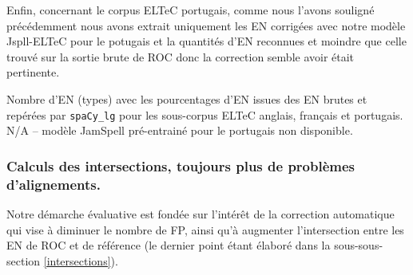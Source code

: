 Enfin, concernant le corpus ELTeC portugais, comme nous l'avons souligné précédemment nous avons extrait uniquement les EN corrigées avec notre modèle Jspll-ELTeC pour le potugais et la quantités d'EN reconnues et moindre que celle trouvé sur la sortie brute de ROC donc la correction semble avoir était pertinente.
\begin{table}[h!]
    \centering
    \small
    
    \caption{Nombre d'EN (types) avec les pourcentages d'EN issues des EN brutes et repérées par \texttt{spaCy\_lg} pour les sous-corpus ELTeC anglais, français et portugais. N/A -- modèle JamSpell pré-entrainé pour le portugais non disponible.}
    \label{tab:ELTeC}
\end{table}

\subsubsection{Calculs des intersections, toujours plus de problèmes d'alignements. }
Notre démarche évaluative est fondée sur l'intérêt de la correction automatique qui vise à diminuer le nombre de FP, ainsi qu'à augmenter l'intersection entre les EN de ROC et de référence (le dernier point étant élaboré dans la sous-sous-section \ref{intersections}). 


